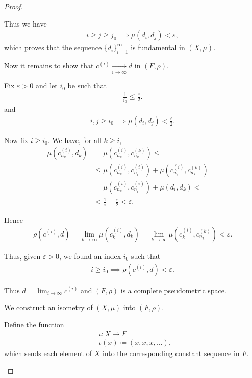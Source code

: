 \begin{proof}
\begin{defenum}
    Thus we have
    \begin{align*}
      i \geq j \geq j_0 \implies \mu(d_i, d_j) < \varepsilon,
    \end{align*}
    which proves that the sequence \( \{ d_i \}_{i=1}^\infty \) is fundamental in \( (X, \mu) \).

    Now it remains to show that \( c^{(i)} \xrightarrow[i \to \infty]{} d \) in \( (F, \rho) \).

    Fix \( \varepsilon > 0 \) and let \( i_0 \) be such that
    \begin{align*}
      \frac 1 {i_0} \leq \frac \varepsilon 2.
    \end{align*}
    and
    \begin{align*}
      i, j \geq i_0 \implies \mu(d_i, d_j) < \frac \varepsilon 2.
    \end{align*}

    Now fix \( i \geq i_0 \). We have, for all \( k \geq i \),
    \begin{align*}
      \mu(c_{n_k}^{(i)}, d_k)
      &=
      \mu(c_{n_k}^{(i)}, c_{n_k}^{(k)})
      \leq \\ &\leq
      \mu(c_{n_k}^{(i)}, c_{n_i}^{(i)}) + \mu(c_{n_i}^{(i)}, c_{n_k}^{(k)})
      = \\ &=
      \mu(c_{n_k}^{(i)}, c_{n_i}^{(i)}) + \mu(d_i, d_k)
      < \\ &<
      \frac 1 i + \frac \varepsilon 2
      <
      \varepsilon.
    \end{align*}

    Hence
    \begin{align*}
      \rho(c^{(i)}, d)
      =
      \lim_{k \to \infty} \mu(c_k^{(i)}, d_k)
      =
      \lim_{k \to \infty} \mu(c_k^{(i)}, c_{n_k}^{(k)})
      <
      \varepsilon.
    \end{align*}

    Thus, given \( \varepsilon > 0 \), we found an index \( i_0 \) such that
    \begin{align*}
      i \geq i_0 \implies \rho(c^{(i)}, d) < \varepsilon.
    \end{align*}

    Thus \( d = \lim_{i \to \infty} c^{(i)} \) and \( (F, \rho) \) is a complete pseudometric space.

    \item\label{thm:metric_space_completion_existence/part_c} We construct an isometry of \( (X, \mu) \) into \( (F, \rho) \).

    Define the function
    \begin{align*}
      &\iota: X \to F \\
      &\iota(x) \coloneqq (x, x, x, \ldots),
    \end{align*}
    which sends each element of \( X \) into the corresponding constant sequence in \( F \).


\end{defenum}
\end{proof}
